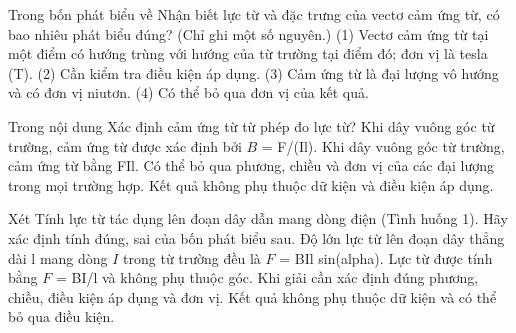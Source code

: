 \begin{ex}
Trong bốn phát biểu về Nhận biết lực từ và đặc trưng của vectơ cảm ứng từ, có bao nhiêu phát biểu đúng? (Chỉ ghi một số nguyên.) (1) Vectơ cảm ứng từ tại một điểm có hướng trùng với hướng của từ trường tại điểm đó; đơn vị là tesla (T). (2) Cần kiểm tra điều kiện áp dụng. (3) Cảm ứng từ là đại lượng vô hướng và có đơn vị niutơn. (4) Có thể bỏ qua đơn vị của kết quả.
\end{ex}

\begin{ex}
Trong nội dung Xác định cảm ứng từ từ phép đo lực từ?
\choice
{\True Khi dây vuông góc từ trường, cảm ứng từ được xác định bởi $B$ = F/(Il).}
{Khi dây vuông góc từ trường, cảm ứng từ bằng FIl.}
{Có thể bỏ qua phương, chiều và đơn vị của các đại lượng trong mọi trường hợp.}
{Kết quả không phụ thuộc dữ kiện và điều kiện áp dụng.}
\end{ex}

\begin{ex}
Xét Tính lực từ tác dụng lên đoạn dây dẫn mang dòng điện (Tình huống 1). Hãy xác định tính đúng, sai của bốn phát biểu sau.
\choiceTF
{\True Độ lớn lực từ lên đoạn dây thẳng dài l mang dòng $I$ trong từ trường đều là $F$ = BIl sin(alpha).}
{Lực từ được tính bằng $F$ = BI/l và không phụ thuộc góc.}
{\True Khi giải cần xác định đúng phương, chiều, điều kiện áp dụng và đơn vị.}
{Kết quả không phụ thuộc dữ kiện và có thể bỏ qua điều kiện.}
\end{ex}

